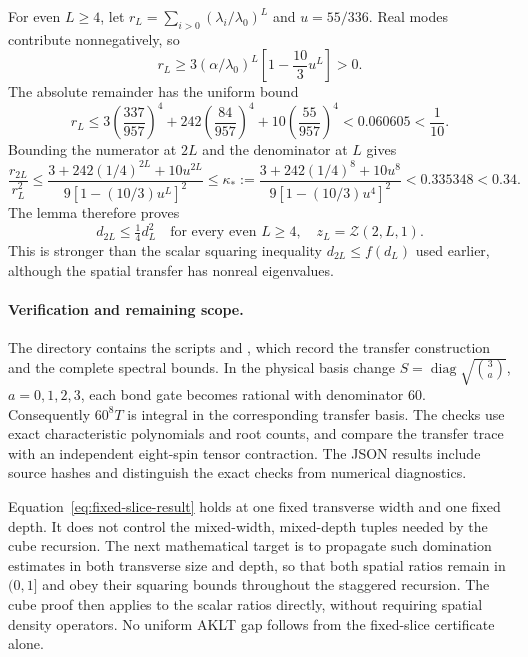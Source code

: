 \documentclass[11pt]{article}
\begin{document}
For even \(L\ge4\), let
\(r_L=\sum_{i>0}(\lambda_i/\lambda_0)^L\) and
\(u=55/336\). Real modes contribute nonnegatively, so
\[
	r_L\ge3(\alpha/\lambda_0)^L
	\left[1-\frac{10}{3}u^L\right]>0.
\]
The absolute remainder has the uniform bound
\[
	r_L\le3\left(\frac{337}{957}\right)^4
	+242\left(\frac{84}{957}\right)^4
	+10\left(\frac{55}{957}\right)^4
	<0.060605<\frac1{10}.
\]
Bounding the numerator at \(2L\) and the denominator at \(L\) gives
\[
	\frac{r_{2L}}{r_L^2}
	\le
	\frac{3+242(1/4)^{2L}+10u^{2L}}
	{9[1-(10/3)u^L]^2}
	\le\kappa_*:=
	\frac{3+242(1/4)^8+10u^8}
	{9[1-(10/3)u^4]^2}
	<0.335348<0.34.
\]
The lemma therefore proves
\begin{equation}
	\boxed{d_{2L}\le\tfrac14d_L^2
		\quad\text{for every even }L\ge4,
		\quad z_L=\mathcal Z(2,L,1).}
	\label{eq:fixed-slice-result}
\end{equation}
This is stronger than the scalar squaring inequality
\(d_{2L}\le f(d_L)\) used earlier, although the spatial transfer
has nonreal eigenvalues.

\paragraph{Verification and remaining scope.}
The directory  contains the scripts
 and
, which record
the transfer construction and the complete spectral bounds. In the
physical basis change \(S=\operatorname{diag}\sqrt{\binom3a}\),
\(a=0,1,2,3\), each bond gate becomes rational with denominator 60.
Consequently \(60^8T\) is integral in the corresponding transfer
basis. The checks use exact characteristic polynomials and root counts,
and compare the transfer trace with an independent eight-spin tensor
contraction. The JSON results include source hashes and distinguish
the exact checks from numerical diagnostics.

Equation~\eqref{eq:fixed-slice-result} holds at one fixed transverse
width and one fixed depth. It does not control the mixed-width,
mixed-depth tuples needed by the cube recursion. The next mathematical
target is to propagate such domination estimates in both transverse
size and depth, so that both spatial ratios remain in \((0,1]\) and
obey their squaring bounds throughout the staggered recursion.
The cube proof then applies to the scalar ratios directly, without
requiring spatial density operators. No uniform AKLT gap follows from
the fixed-slice certificate alone.
\end{document}

